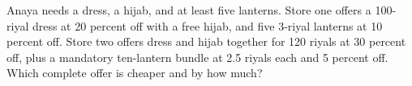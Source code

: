 Anaya needs a dress, a hijab, and at least five lanterns. Store one offers a 100-riyal dress at 20 percent off with a free hijab, and five 3-riyal lanterns at 10 percent off. Store two offers dress and hijab together for 120 riyals at 30 percent off, plus a mandatory ten-lantern bundle at 2.5 riyals each and 5 percent off. Which complete offer is cheaper and by how much?
